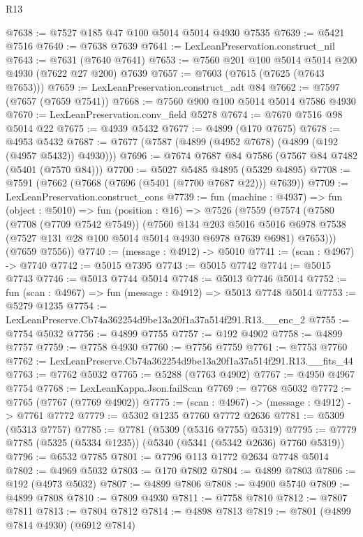 \begin{lexlean}{R13}
\begin{coremodule}
@7638 := @7527 @185 @47 @100 @5014 @5014 @4930 @7535
@7639 := @5421 @7516
@7640 := @7638 @7639
@7641 := LexLeanPreservation.construct_nil
@7643 := @7631 (@7640 @7641)
@7653 := @7560 @201 @100 @5014 @5014 @200 @4930 (@7622 @27 @200) @7639
@7657 := @7603 (@7615 (@7625 (@7643 @7653)))
@7659 := LexLeanPreservation.construct_adt @84
@7662 := @7597 (@7657 (@7659 @7541))
@7668 := @7560 @900 @100 @5014 @5014 @7586 @4930
@7670 := LexLeanPreservation.conv_field @5278
@7674 := @7670 @7516 @98 @5014 @22
@7675 := @4939 @5432
@7677 := @4899 (@170 @7675)
@7678 := @4953 @5432
@7687 := @7677 (@7587 (@4899 (@4952 @7678) (@4899 (@192 (@4957 @5432)) @4930)))
@7696 := @7674 @7687 @84 @7586 (@7567 @84 @7482 (@5401 (@7570 @84)))
@7700 := @5027 @5485 @4895 (@5329 @4895)
@7708 := @7591 (@7662 (@7668 (@7696 (@5401 (@7700 @7687 @22))) @7639))
@7709 := LexLeanPreservation.construct_cons
@7739 := fun (machine : @4937) =>
  fun (object : @5010) =>
  fun (position : @16) =>
  @7526
    (@7559
      (@7574
        (@7580
          (@7708 (@7709 @7542 @7549))
          (@7560
            @134
            @203
            @5016
            @5016
            @6978
            @7538
            (@7527 @131 @28 @100 @5014 @5014 @4930 @6978 @7639 @6981)
            @7653)))
      (@7659 @7556))
@7740 := (message : @4912) -> @5010
@7741 := (scan : @4967) -> @7740
@7742 := @5015 @7395
@7743 := @5015 @7742
@7744 := @5015 @7743
@7746 := @5013 @7744 @5014
@7748 := @5013 @7746 @5014
@7752 := fun (scan : @4967) => fun (message : @4912) => @5013 @7748 @5014
@7753 := @5279 @1235
@7754 := LexLeanPreserve.Cb74a362254d9be13a20f1a37a514f291.R13.__enc_2
@7755 := @7754 @5032
@7756 := @4899 @7755
@7757 := @192 @4902
@7758 := @4899 @7757
@7759 := @7758 @4930
@7760 := @7756 @7759
@7761 := @7753 @7760
@7762 := LexLeanPreserve.Cb74a362254d9be13a20f1a37a514f291.R13.__fits_44
@7763 := @7762 @5032
@7765 := @5288 (@7763 @4902)
@7767 := @4950 @4967 @7754
@7768 := LexLeanKappa.Json.failScan
@7769 := @7768 @5032
@7772 := @7765 (@7767 (@7769 @4902))
@7775 := (scan : @4967) -> (message : @4912) -> @7761 @7772
@7779 := @5302 @1235 @7760 @7772 @2636
@7781 := @5309 (@5313 @7757)
@7785 := @7781 (@5309 (@5316 @7755) @5319)
@7795 := @7779 @7785 (@5325 (@5334 @1235)) (@5340 (@5341 (@5342 @2636) @7760 @5319))
@7796 := @6532 @7785
@7801 := @7796 @113 @1772 @2634 @7748 @5014
@7802 := @4969 @5032
@7803 := @170 @7802
@7804 := @4899 @7803
@7806 := @192 (@4973 @5032)
@7807 := @4899 @7806
@7808 := @4900 @5740
@7809 := @4899 @7808
@7810 := @7809 @4930
@7811 := @7758 @7810
@7812 := @7807 @7811
@7813 := @7804 @7812
@7814 := @4898 @7813
@7819 := @7801 (@4899 @7814 @4930) (@6912 @7814)

\end{coremodule}
\end{lexlean}

